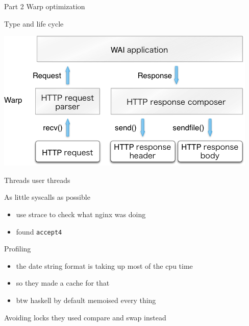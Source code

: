 \documentclass[presentation]{beamer}
\begin{document}
\begin{frame}[label={sec:org785492e},fragile]{Part 2 Warp optimization}
\begin{block}{Type and life cycle}
\begin{center}
\includegraphics[width=.9\linewidth]{Part_2_Warp_optimization/2020-08-20_15-47-23_screenshot.png}
\end{center}
\end{block}
\begin{block}{Threads}
user threads
\end{block}
\begin{block}{As little syscalls as possible}
\begin{itemize}
\item use strace to check what nginx was doing
\item found \texttt{accept4}
\end{itemize}
\end{block}
\begin{block}{Profiling}
\begin{itemize}
\item the date string format is taking up most of the cpu time
\item so they made a cache for that
\item btw haskell by default memoised every thing
\end{itemize}
\end{block}
\begin{block}{Avoiding locks}
they used compare and swap instead
\end{block}


\end{frame}
\end{document}
